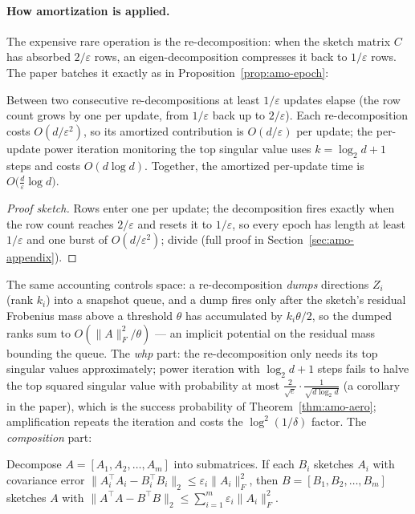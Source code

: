 \paragraph{How amortization is applied.}
The expensive rare operation is the re-decomposition: when the sketch matrix
$C$ has absorbed $2/\varepsilon$ rows, an eigen-decomposition compresses it
back to $1/\varepsilon$ rows. The paper batches it exactly as in
Proposition~\ref{prop:amo-epoch}:

\begin{lemma}\label{lem:amo-aero-batch}
Between two consecutive re-decompositions at least $1/\varepsilon$ updates
elapse (the row count grows by one per update, from $1/\varepsilon$ back up
to $2/\varepsilon$). Each re-decomposition costs $O(d/\varepsilon^{2})$, so
its amortized contribution is $O(d/\varepsilon)$ per update; the per-update
power iteration monitoring the top singular value uses $k = \log_2 d + 1$
steps and costs $O(d \log d)$. Together, the amortized per-update time is
$O\bigl(\tfrac{d}{\varepsilon} \log d\bigr)$. \eop
\end{lemma}

\begin{proof}[Proof sketch]
Rows enter one per update; the decomposition fires exactly when the row count
reaches $2/\varepsilon$ and resets it to $1/\varepsilon$, so every epoch has
length at least $1/\varepsilon$ and one burst of $O(d/\varepsilon^2)$;
divide (full proof in Section~\ref{sec:amo-appendix}).
\end{proof}

The same accounting controls space: a re-decomposition \emph{dumps}
directions $Z_i$ (rank $k_i$) into a snapshot queue, and a dump fires only
after the sketch's residual Frobenius mass above a threshold $\theta$ has
accumulated by $k_i\theta/2$, so the dumped ranks sum to $O(\|A\|_F^2/
\theta)$ --- an implicit potential on the residual mass bounding the
queue. The \emph{whp} part: the re-decomposition only needs its top
singular values approximately; power iteration with $\log_2 d + 1$ steps
fails to halve the top squared singular value with probability at most
$\tfrac{2}{\sqrt{e}} \cdot \tfrac{1}{\sqrt{d \log_2 d}}$ (a corollary in
the paper), which is the success probability of
Theorem~\ref{thm:amo-aero}; amplification repeats the iteration and costs
the $\log^{2}(1/\delta)$ factor. The \emph{composition} part:

\begin{lemma}
\label{lem:amo-aero-decomp}
Decompose $A = [A_1, A_2, \dots, A_m]$ into submatrices. If each $B_i$
sketches $A_i$ with covariance error $\|A_i^{\top} A_i - B_i^{\top}
B_i\|_2 \le \varepsilon_i \|A_i\|_F^{2}$, then $B = [B_1, B_2, \dots, B_m]$
sketches $A$ with $\| A^{\top} A - B^{\top} B \|_2 \le
\textstyle\sum_{i=1}^{m} \varepsilon_i \|A_i\|_F^{2}$. \eop
\end{lemma}

